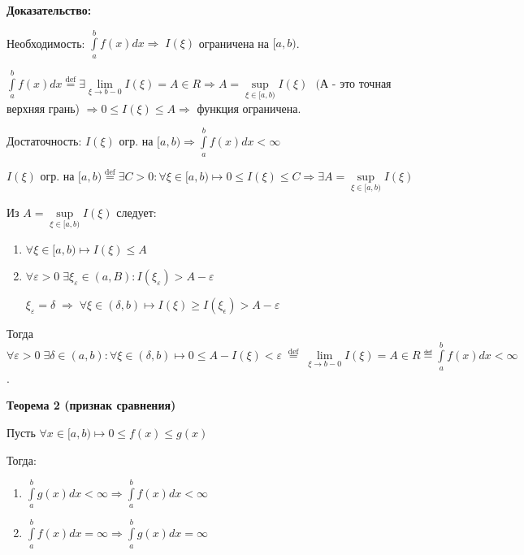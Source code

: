 \documentclass[a4paper,12pt]{article} %
\begin{document}
\textbf{Доказательство:} 

Необходимость: $\int\limits_a^{b} f(x) dx \Rightarrow\; I(\xi)$ ограничена на $[a, b)$.

$\int\limits_a^{b} f(x) dx \stackrel{\text{def}}{=} \exists \lim\limits_{\xi \rightarrow b-0}I(\xi) =A \in R \Rightarrow A = \sup\limits_{\xi \in[a,b)} I(\xi)\text{ }(А$\; - это\; точная\; верхняя\; грань) $ \Rightarrow 0 \leq I(\xi) \leq A \Rightarrow$ функция ограничена.

Достаточность: $I(\xi)$  огр. на $[a, b) \Rightarrow \int\limits_a^{b} f(x) dx < \infty$

$I(\xi)$ \; огр. на $[a, b) \stackrel{\text{def}}{=} \exists C>0 : \forall \xi \in[a, b) \longmapsto 0 \leq I(\xi) \leq C \Rightarrow \exists A = \sup\limits_{\xi \in [a,b)}I(\xi)$

Из $A = \sup\limits_{\xi \in[a,b)} I(\xi)$ следует:

\begin{enumerate}
    \item $\forall \xi \in [a, b) \mapsto I(\xi) \leq A$
    
    \item $\forall \varepsilon > 0\; \exists \xi_\varepsilon \in (a, B) : I(\xi_\varepsilon)>A-\varepsilon$
    
    $\xi_\varepsilon = \delta \; \Rightarrow \; \forall \xi \in(\delta, b) \longmapsto I(\xi) \geq I(\xi_\epsilon)> A-\varepsilon$
\end{enumerate}

Тогда $\forall \varepsilon > 0 \; \exists\delta\in(a, b): \forall \xi \in(\delta, b) \longmapsto 0\leq A-I(\xi) < \varepsilon \; \stackrel{\text{def}}{=}\; \lim\limits_{\xi \rightarrow b-0} I(\xi) = A \in R \eqdef \int\limits_a^{b} f(x) dx < \infty$.

\vspace{20}

\textbf{Теорема 2 (признак сравнения)}

Пусть $\forall x \in [a, b) \longmapsto 0\leq f(x) \leq g(x)$

Тогда:

\begin{enumerate}
    \item $\int\limits_a^{b} g(x) dx < \infty \Rightarrow \int\limits_a^{b} f(x) dx < \infty$
    
    \item $\int\limits_a^{b} f(x) dx = \infty \Rightarrow \int\limits_a^{b} g(x) dx = \infty$
\end{enumerate}
\end{document}
